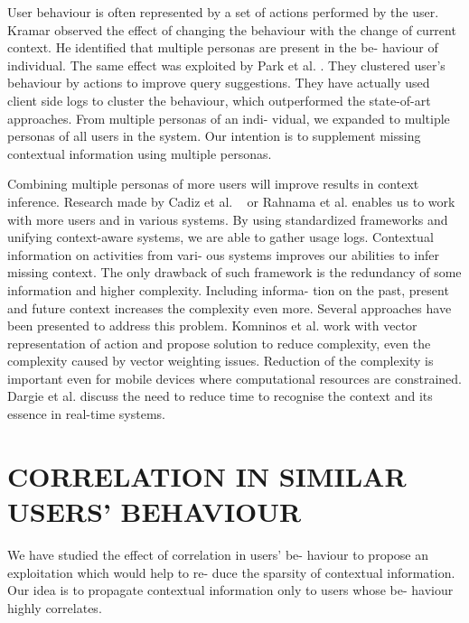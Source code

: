 \documentclass{acm_proc_article-sp}
\begin{document}
User behaviour is often represented by a set of actions performed by the user. Kramar observed the effect of changing the behaviour with the change of current context. He identified that multiple personas are present in the be-
haviour of individual. The same effect was exploited by
Park et al. . They clustered user's behaviour by actions
to improve query suggestions. They have actually used client
side logs to cluster the behaviour, which outperformed the
state-of-art approaches. From multiple personas of an indi-
vidual, we expanded to multiple personas of all users in the
system. Our intention is to supplement missing contextual
information using multiple personas.

Combining multiple personas of more users will improve
results in context inference. Research made by Cadiz et al. ~\cite{cadiz2009orchestrating}
or Rahnama et al. enables us to work with more users
and in various systems. By using standardized frameworks
and unifying context-aware systems, we are able to gather
usage logs. Contextual information on activities from vari-
ous systems improves our abilities to infer missing context.
The only drawback of such framework is the redundancy of
some information and higher complexity. Including informa-
tion on the past, present and future context increases
the complexity even more. Several approaches have been
presented to address this problem. Komninos et al. work
with vector representation of action and propose solution
to reduce complexity, even the complexity caused by vector
weighting issues. Reduction of the complexity is important
even for mobile devices where computational resources are
constrained. Dargie et al. discuss the need to reduce time
to recognise the context and its essence in real-time systems.

\section{CORRELATION IN SIMILAR USERS' BEHAVIOUR}
We have studied the effect of correlation in users' be-
haviour to propose an exploitation which would help to re-
duce the sparsity of contextual information. Our idea is to
propagate contextual information only to users whose be-
haviour highly correlates.

\end{document}
